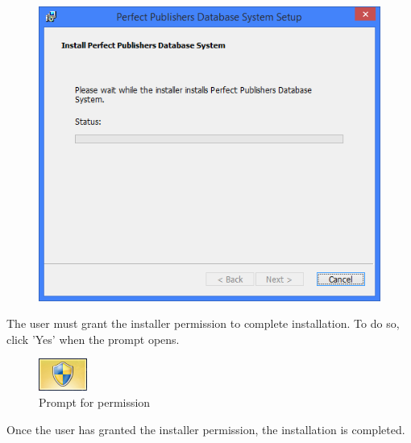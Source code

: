 \begin{figure}[H]
    \includegraphics[width=\textwidth]{./Manual/Installation/PleaseWaitScreen.png}
\end{figure}

The user must grant the installer permission to complete installation. To do so, click 'Yes' when the prompt opens.

\begin{figure}[H]
    \includegraphics[width=\textwidth]{./Manual/Installation/Permission.png}
    \caption{Prompt for permission}
\end{figure}

Once the user has granted the installer permission, the installation is completed.

